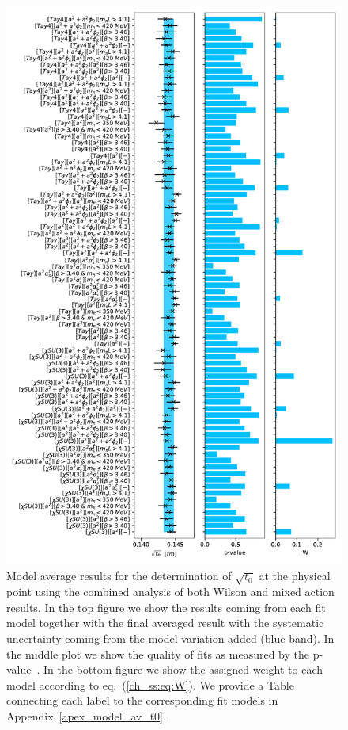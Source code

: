 \begin{figure}
    \centering
    \includegraphics[width=1.\textwidth]{./cap5/figs/BMA_comb.pdf}
    \caption{Model average results for the determination of $\sqrt{t_0}$ at the physical point using the combined analysis of both Wilson and mixed action results. In the top figure we show the results coming from each fit model together with the final averaged result with the systematic uncertainty coming from the model variation added (blue band). In the middle plot we show the quality of fits as measured by the p-value~\citep{Bruno:2022mfy}. In the bottom figure we show the assigned weight to each model according to eq.~(\ref{ch_ss:eq:W}). We provide a Table connecting each label to the corresponding fit models in Appendix~\ref{apex_model_av_t0}.}
    \label{ch_ss:fig:BMA_comb}
\end{figure}

